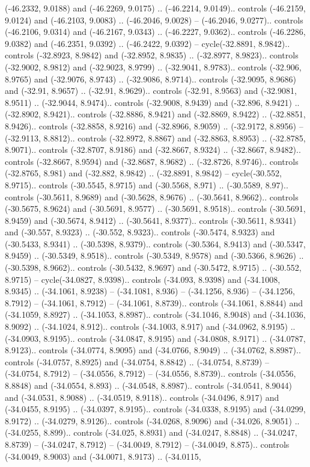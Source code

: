 \begin{scope}[shift={(2.5552, 9.9912)}]
\begin{scope}[shift={(48.1654, -14.8546)}]
(-46.2332, 9.0188) and (-46.2269, 9.0175) .. (-46.2214, 9.0149).. controls (-46.2159, 9.0124) and (-46.2103, 9.0083) .. (-46.2046, 9.0028) -- (-46.2046, 9.0277).. controls (-46.2106, 9.0314) and (-46.2167, 9.0343) .. (-46.2227, 9.0362).. controls (-46.2286, 9.0382) and (-46.2351, 9.0392) .. (-46.2422, 9.0392) -- cycle(-32.8891, 8.9842).. controls (-32.8923, 8.9842) and (-32.8952, 8.9835) .. (-32.8977, 8.9823).. controls (-32.9002, 8.9812) and (-32.9023, 8.9799) .. (-32.9041, 8.9783).. controls (-32.906, 8.9765) and (-32.9076, 8.9743) .. (-32.9086, 8.9714).. controls (-32.9095, 8.9686) and (-32.91, 8.9657) .. (-32.91, 8.9629).. controls (-32.91, 8.9563) and (-32.9081, 8.9511) .. (-32.9044, 8.9474).. controls (-32.9008, 8.9439) and (-32.896, 8.9421) .. (-32.8902, 8.9421).. controls (-32.8886, 8.9421) and (-32.8869, 8.9422) .. (-32.8851, 8.9426).. controls (-32.8858, 8.9216) and (-32.8966, 8.9059) .. (-32.9172, 8.8956) -- (-32.9113, 8.8812).. controls (-32.8972, 8.8867) and (-32.8863, 8.8953) .. (-32.8785, 8.9071).. controls (-32.8707, 8.9186) and (-32.8667, 8.9324) .. (-32.8667, 8.9482).. controls (-32.8667, 8.9594) and (-32.8687, 8.9682) .. (-32.8726, 8.9746).. controls (-32.8765, 8.981) and (-32.882, 8.9842) .. (-32.8891, 8.9842) -- cycle(-30.552, 8.9715).. controls (-30.5545, 8.9715) and (-30.5568, 8.971) .. (-30.5589, 8.97).. controls (-30.5611, 8.9689) and (-30.5628, 8.9676) .. (-30.5641, 8.9662).. controls (-30.5675, 8.9624) and (-30.5691, 8.9577) .. (-30.5691, 8.9518).. controls (-30.5691, 8.9459) and (-30.5674, 8.9412) .. (-30.5641, 8.9377).. controls (-30.5611, 8.9341) and (-30.557, 8.9323) .. (-30.552, 8.9323).. controls (-30.5474, 8.9323) and (-30.5433, 8.9341) .. (-30.5398, 8.9379).. controls (-30.5364, 8.9413) and (-30.5347, 8.9459) .. (-30.5349, 8.9518).. controls (-30.5349, 8.9578) and (-30.5366, 8.9626) .. (-30.5398, 8.9662).. controls (-30.5432, 8.9697) and (-30.5472, 8.9715) .. (-30.552, 8.9715) -- cycle(-34.0827, 8.9398).. controls (-34.093, 8.9398) and (-34.1008, 8.9345) .. (-34.1061, 8.9238) -- (-34.1081, 8.936) -- (-34.1256, 8.936) -- (-34.1256, 8.7912) -- (-34.1061, 8.7912) -- (-34.1061, 8.8739).. controls (-34.1061, 8.8844) and (-34.1059, 8.8927) .. (-34.1053, 8.8987).. controls (-34.1046, 8.9048) and (-34.1036, 8.9092) .. (-34.1024, 8.912).. controls (-34.1003, 8.917) and (-34.0962, 8.9195) .. (-34.0903, 8.9195).. controls (-34.0847, 8.9195) and (-34.0808, 8.9171) .. (-34.0787, 8.9123).. controls (-34.0774, 8.9095) and (-34.0766, 8.9049) .. (-34.0762, 8.8987).. controls (-34.0757, 8.8925) and (-34.0754, 8.8842) .. (-34.0754, 8.8739) -- (-34.0754, 8.7912) -- (-34.0556, 8.7912) -- (-34.0556, 8.8739).. controls (-34.0556, 8.8848) and (-34.0554, 8.893) .. (-34.0548, 8.8987).. controls (-34.0541, 8.9044) and (-34.0531, 8.9088) .. (-34.0519, 8.9118).. controls (-34.0496, 8.917) and (-34.0455, 8.9195) .. (-34.0397, 8.9195).. controls (-34.0338, 8.9195) and (-34.0299, 8.9172) .. (-34.0279, 8.9126).. controls (-34.0268, 8.9096) and (-34.026, 8.9051) .. (-34.0255, 8.899).. controls (-34.025, 8.8931) and (-34.0247, 8.8848) .. (-34.0247, 8.8739) -- (-34.0247, 8.7912) -- (-34.0049, 8.7912) -- (-34.0049, 8.875).. controls (-34.0049, 8.9003) and (-34.0071, 8.9173) .. (-34.0115, 
\end{scope}
\end{scope}
